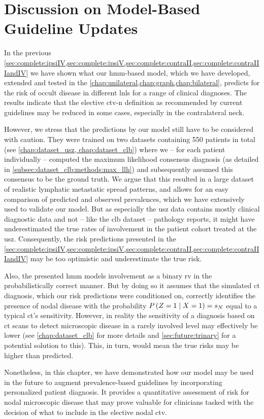 \documentclass[\relativeRoot/main.tex]{subfiles}
\begin{document}
\section[Discussion on Model-Based Guideline Updates]{Discussion on Model-Based\\Guideline Updates}
\label{sec:complete:dicussion}

In the previous \cref{sec:complete:ipsiIV,sec:complete:ipsiV,sec:complete:contraII,sec:complete:contraIIIandIV} we have shown what our \gls{hmm}-based model, which we have developed, extended and tested in the \cref{chap:unilateral,chap:graph,chap:bilateral}, predicts for the risk of occult disease in different \glspl{lnl} for a range of clinical diagnoses. The results indicate that the elective \gls{ctv-n} definition as recommended by current guidelines \cite{gregoire_delineation_2014,biau_selection_2019} may be reduced in some cases, especially in the contralateral neck.

However, we stress that the predictions by our model still have to be considered with caution. They were trained on two datasets containing 550 patients in total (see \cref{chap:dataset_usz, chap:dataset_clb}) where we -- for each patient individually -- computed the maximum likelihood consensus diagnosis (as detailed in \cref{subsec:dataset_clb:methods:max_llh}) and subsequently assumed this consensus to be the ground truth. We argue that this resulted in a large dataset of realistic lymphatic metastatic spread patterns, and allows for an easy comparison of predicted and observed prevalences, which we have extensively used to validate our model. But as especially the \gls{usz} data \cite{ludwig_detailed_2021} contains mostly clinical diagnostic data and not -- like the \gls{clb} dataset \cite{bauwens_prevalence_2021} -- pathology reports, it might have underestimated the true rates of involvement in the patient cohort treated at the \gls{usz}. Consequently, the risk predictions presented in the \cref{sec:complete:ipsiIV,sec:complete:ipsiV,sec:complete:contraII,sec:complete:contraIIIandIV} may be too optimistic and underestimate the true risk.

Also, the presented \gls{hmm} models involvement as a binary \acrshort{rv} in the probabilistically correct manner. But by doing so it assumes that the simulated \gls{ct} diagnosis, which our risk predictions were conditioned on, correctly identifies the presence of nodal disease with the probability $P \left( Z=1 \mid X=1 \right) = s_N$ equal to a typical \gls{ct}'s sensitivity. However, in reality the sensitivity of a diagnosis based on \gls{ct} scans to detect microscopic disease in a rarely involved level may effectively be lower (see \cref{chap:dataset_clb} for more details and \cref{sec:future:trinary} for a potential solution to this). This, in turn, would mean the true risks may be higher than predicted.

Nonetheless, in this chapter, we have demonstrated how our model may be used in the future to augment prevalence-based guidelines by incorporating personalized patient diagnosis. It provides a quantitative assessment of risk for nodal microscopic disease that may prove valuable for clinicians tasked with the decision of what to include in the elective nodal \gls{ctv}.
\end{document}
